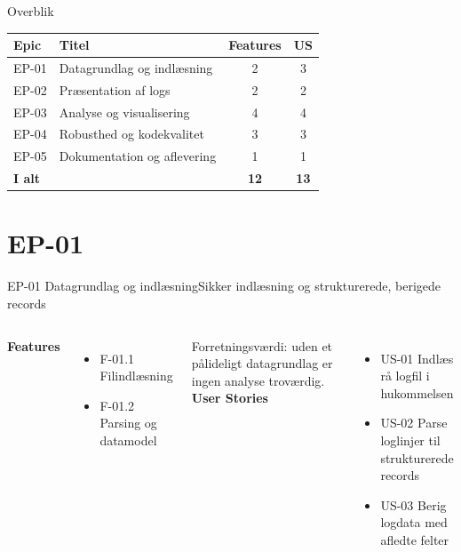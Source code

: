 \documentclass[aspectratio=169,10pt]{beamer}
\newcommand{\done}{\textcolor{accent}{\faCheckCircle}}
\begin{document}
\begin{frame}{Overblik}
  \centering
  \small
  \begin{tabularx}{\textwidth}{@{}l X c c@{}}
    \toprule
    \textbf{Epic} & \textbf{Titel} & \textbf{Features} & \textbf{US} \\
    \midrule
    EP-01 & Datagrundlag og indlæsning & 2 & 3 \\
    EP-02 & Præsentation af logs       & 2 & 2 \\
    EP-03 & Analyse og visualisering   & 4 & 4 \\
    EP-04 & Robusthed og kodekvalitet  & 3 & 3 \\
    EP-05 & Dokumentation og aflevering& 1 & 1 \\
    \midrule
    \textbf{I alt} & & \textbf{12} & \textbf{13} \\
    \bottomrule
  \end{tabularx}
\end{frame}

\section{EP-01}
\begin{frame}{EP-01 Datagrundlag og indlæsning}{Sikker indlæsning og strukturerede, berigede records}
  \begin{columns}[T]
    \textbf{Features}
    \vspace{0.3em}
    \begin{itemize}
      \item F-01.1 Filindlæsning
      \item F-01.2 Parsing og datamodel
    \end{itemize}
    \vspace{0.4em}
    {\footnotesize\color{muted}Forretningsværdi: uden et pålideligt datagrundlag er ingen analyse troværdig.}
    \textbf{User Stories}
    \vspace{0.3em}
    \begin{itemize}
      \item[\done] US-01 Indlæs rå logfil i hukommelsen
      \item[\done] US-02 Parse loglinjer til strukturerede records
      \item[\done] US-03 Berig logdata med afledte felter
    \end{itemize}
  \end{columns}
\end{frame}
\end{document}
